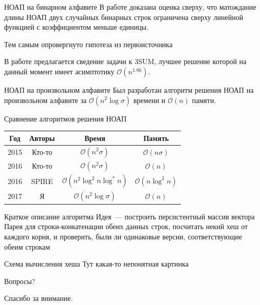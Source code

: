 \documentclass[hyperref=unicode,graphics=pdflatex,12pt]{beamer}
\begin{document}
\begin{frame}{НОАП на бинарном алфавите}
\hspace{0.5cm}
В работе доказана оценка сверху, что матождание длины НОАП двух случайных бинарных строк
ограничена сверху линейной функцией с коэффициентом меньше единицы.

Тем самым опровергнуто гипотеза из первоисточника

\vspace{0.5cm}
\hspace{0.5cm}
В работе предлагается сведение задачи к 3SUM, лучшее решение которой на данный момент имеет
асимптотику $\mathcal{O}(n^{1.86})$.
\end{frame}

\begin{frame}{НОАП на произвольном алфавите}
\hspace{0.5cm}
Был разработан алгоритм решения НОАП на произвольном алфавите
за $\mathcal{O}(n^2 \log \sigma)$ времени и $\mathcal{O}(n)$ памяти.

\vspace{0.5cm}

Сравнение алгоритмов решения НОАП

\begin{center}
\begin{tabular}{|c|c|c|c|}
\hline
Год & Авторы & Время & Память \\
\hline
2015 & Кто-то & $\mathcal{O}(n^2 \sigma)$ & $\mathcal{O}(n \sigma)$ \\
\hline
2016 & Кто-то & $\mathcal{O}(n^2 \sigma)$ & $\mathcal{O}(n)$ \\
\hline
2016 & SPIRE & $\mathcal{O}(n^2 \log^2 n \log^* n)$ & $\mathcal{O}(n \log^2 n)$ \\
\hline
2017 & Я & $\mathcal{O}(n^2 \log \sigma)$ & $\mathcal{O}(n)$ \\
\hline
\end{tabular}
\end{center}
\end{frame}
      
\begin{frame}{Краткое описание алгоритма}
\vspace{0.5cm}
\hspace{0.5cm}
Идея~--- построить персистентный массив вектора Парея для строки-конкатенации обеих данных строк,
посчитать некий хеш от каждого корня, и проверить, были ли одинаковые версии, соответствующие обеим строкам
\end{frame}

\begin{frame}{Схема вычисления хеша}
Тут какая-то непонятная картинка
\end{frame}

\begin{frame}{Вопросы?}
\begin{center}
Спасибо за внимание.
\end{center}
\end{frame}
\end{document}

